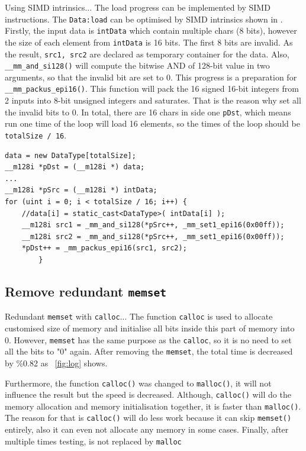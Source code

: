 \documentclass[conference]{IEEEtran}
\newcommand{\fref}[1]{\figurename~\ref{#1}}
\begin{document}
Using SIMD intrinsics...
The load progress can be implemented by SIMD instructions. The \texttt{Data:load} can be optimised by SIMD intrinsics shown in \cite{advnotes}. Firstly, the input data is \texttt{intData} which contain multiple chars (8 bits), however the size of each element from \texttt{intData} is 16 bits. The first 8 bits are invalid. As the result, \texttt{src1, src2} are declared as temporary container for the data. Also, \texttt{\_\_mm\_and\_si128()} will compute the bitwise AND of 128-bit value in two arguments, so that the invalid bit are set to 0. This progress is a preparation for \texttt{\_\_mm\_packus\_epi16()}. This function will pack the 16 signed 16-bit integers from 2 inputs into 8-bit unsigned integers and saturates. That is the reason why set all the invalid bits to 0. In total, there are 16 chars in side one \texttt{pDst}, which means run one time of the loop will load 16 elements, so the times of the loop should be \texttt{totalSize / 16}.
\begin{lstlisting}[caption={Data Load with SIMD Intrinsics},captionpos=b,label=lst:mem]
data = new DataType[totalSize];
__m128i *pDst = (__m128i *) data;
...
__m128i *pSrc = (__m128i *) intData;
for (uint i = 0; i < totalSize / 16; i++) {
	//data[i] = static_cast<DataType>( intData[i] );
	__m128i src1 = _mm_and_si128(*pSrc++, _mm_set1_epi16(0x00ff));
	__m128i src2 = _mm_and_si128(*pSrc++, _mm_set1_epi16(0x00ff));
	*pDst++ = _mm_packus_epi16(src1, src2);
		}
\end{lstlisting}

\subsection{Remove redundant \texttt{memset}}

Redundant \texttt{memset} with \texttt{calloc}...
The function \texttt{calloc} is used to allocate customised size of memory and initialise all bits inside this part of memory into 0. However, \texttt{memset} has the same purpose as the \texttt{calloc}, so it is no need to set all the bits to "0" again. After removing the \texttt{memset}, the total time is decreased by \%0.82 as \fref{fig:log} shows. 

Furthermore, the function \texttt{calloc()} was changed to \texttt{malloc()}, it will not influence the result but the speed is decreased. Although, \texttt{calloc()} will do the memory allocation and memory initialisation together, it is faster than \texttt{malloc()}. The reason for that is \texttt{calloc()} will do less work because it can skip \texttt{memset()} entirely, also it can even not allocate any memory in some cases. Finally, after multiple times testing, \cite{calloc} is not replaced by \texttt{malloc}
\end{document}
